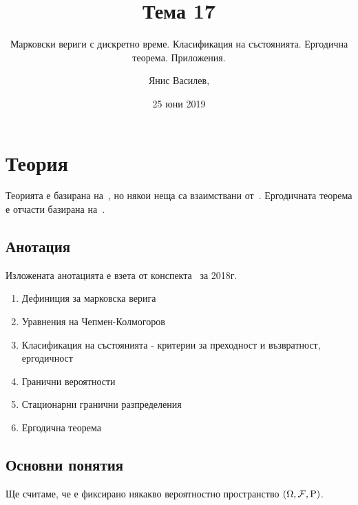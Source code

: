 \documentclass[numbers=endperiod, bibliography=totocnumbered]{scrartcl}
\title{Тема 17}
\subtitle{Марковски вериги с дискретно време. Класификация на състоянията. Ергодична теорема. Приложения.}
\author{Янис Василев, \Email{ianis@ivasilev.net}}
\date{25 юни 2019}
\begin{document}
\maketitle

\section{Теория}

Теорията е базирана на~\cite{Lectures}, но някои неща са взаимствани от~\cite{Borovkov}. Ергодичната теорема е отчасти базирана на~\cite{Ergodic}.

\subsection{Анотация}

Изложената анотацията е взета от конспекта~\cite{Syllabus} за 2018г.

\begin{enumerate}
  \item Дефиниция за марковска верига
  \item Уравнения на Чепмен-Колмогоров
  \item Класификация на състоянията - критерии за преходност и възвратност, ергодичност
  \item Гранични вероятности
  \item Стационарни гранични разпределения
  \item Ергодична теорема
\end{enumerate}

\subsection{Основни понятия}

Ще считаме, че е фиксирано някакво вероятностно пространство \( (\Omega, \mathcal{F}, \operatorname{P}) \).
\end{document}
